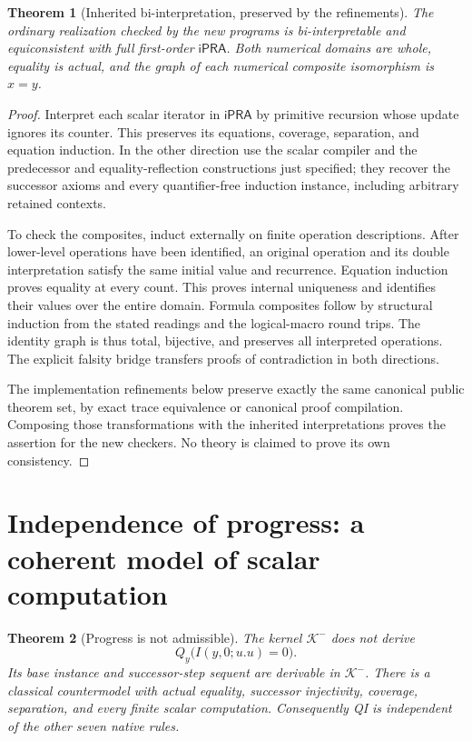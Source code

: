 \documentclass[11pt,letterpaper]{article}
\newtheorem{theorem}{Theorem}[section]
\theoremstyle{definition}
\newcommand{\ipra}{\mathsf{iPRA}}
\newcommand{\Km}{\mathcal K^{-}}
\begin{document}
\begin{theorem}[Inherited bi-interpretation, preserved by the refinements]
The ordinary realization checked by the new programs is bi-interpretable
and equiconsistent with full first-order $\ipra$. Both numerical domains
are whole, equality is actual, and the graph of each numerical composite
isomorphism is $x=y$.
\end{theorem}
\begin{proof}
Interpret each scalar iterator in $\ipra$ by primitive recursion whose
update ignores its counter. This preserves its equations, coverage,
separation, and equation induction. In the other direction use the scalar
compiler and the predecessor and equality-reflection constructions just
specified; they recover the successor axioms and every quantifier-free
induction instance, including arbitrary retained contexts.

To check the composites, induct externally on finite operation
descriptions. After lower-level operations have been identified, an
original operation and its double interpretation satisfy the same initial
value and recurrence. Equation induction proves equality at every count.
This proves internal uniqueness and identifies their values over the
entire domain. Formula composites follow by structural induction from
the stated readings and the logical-macro round trips. The identity graph
is thus total, bijective, and preserves all interpreted operations.
The explicit falsity bridge transfers proofs of contradiction in both
directions.

The implementation refinements below preserve exactly the same canonical
public theorem set, by exact trace equivalence or canonical proof
compilation. Composing those transformations with the inherited
interpretations proves the assertion for the new checkers. No theory is
claimed to prove its own consistency.
\end{proof}


\section{Independence of progress: a coherent model of scalar computation}
\label{sec:progress-independence-audit}

\begin{theorem}[Progress is not admissible]
The kernel $\Km$ does not derive
\[
 Q_y\bigl(I(y,0;u.u)=0\bigr).
\]
Its base instance and successor-step sequent are derivable in $\Km$.
There is a classical countermodel with actual equality, successor
injectivity, coverage, separation, and every finite scalar computation.
Consequently QI is independent of the other seven native rules.
\end{theorem}
\end{document}
